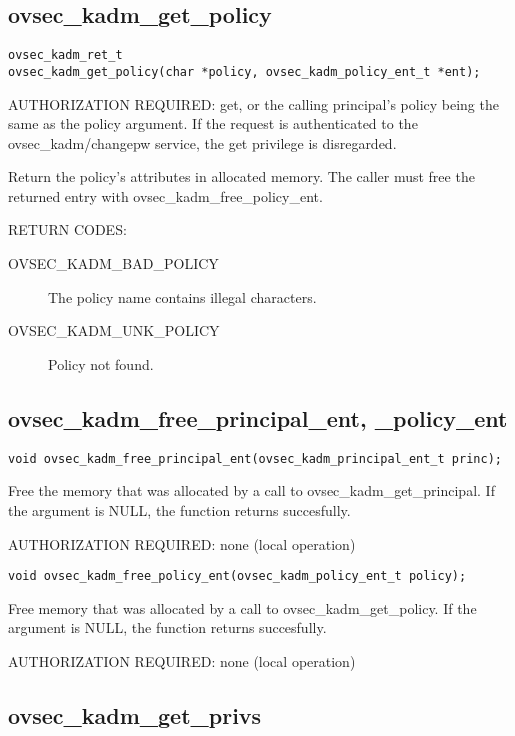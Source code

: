 \subsection{ovsec_kadm_get_policy}

\begin{verbatim}
ovsec_kadm_ret_t
ovsec_kadm_get_policy(char *policy, ovsec_kadm_policy_ent_t *ent); 
\end{verbatim}

AUTHORIZATION REQUIRED: get, or the calling principal's policy being
the same as the policy argument.  If the request is authenticated to
the ovsec_kadm/changepw service, the get privilege is disregarded.

Return the policy's attributes in allocated memory.  The caller must
free the returned entry with ovsec_kadm_free_policy_ent.

RETURN CODES: 

\begin{description}
\item[OVSEC_KADM_BAD_POLICY] The policy name contains illegal characters.
\item[OVSEC_KADM_UNK_POLICY] Policy not found.
\end{description}

\subsection{ovsec_kadm_free_principal_ent, _policy_ent}

\begin{verbatim}
void ovsec_kadm_free_principal_ent(ovsec_kadm_principal_ent_t princ);
\end{verbatim}

Free the memory that was allocated by a call to
ovsec_kadm_get_principal.  If the argument is NULL, the function
returns succesfully.

AUTHORIZATION REQUIRED: none (local operation)

\begin{verbatim}
void ovsec_kadm_free_policy_ent(ovsec_kadm_policy_ent_t policy);
\end{verbatim}

Free memory that was allocated by a call to ovsec_kadm_get_policy.  If
the argument is NULL, the function returns succesfully.

AUTHORIZATION REQUIRED: none (local operation)

\subsection{ovsec_kadm_get_privs}

